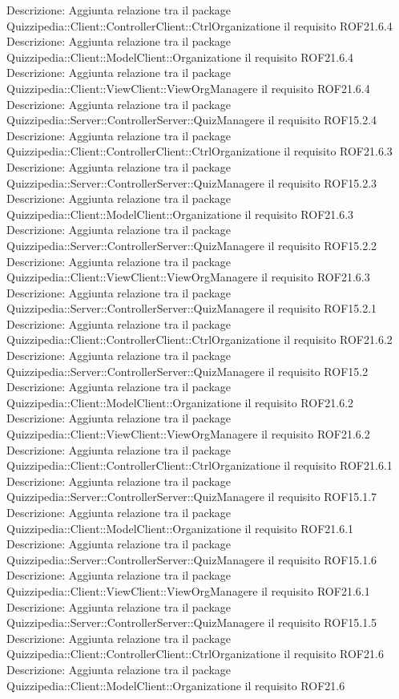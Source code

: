 Descrizione: Aggiunta relazione tra il package Quizzipedia::Client::ControllerClient::CtrlOrganizatione il requisito ROF21.6.4 
Descrizione: Aggiunta relazione tra il package Quizzipedia::Client::ModelClient::Organizatione il requisito ROF21.6.4 
Descrizione: Aggiunta relazione tra il package Quizzipedia::Client::ViewClient::ViewOrgManagere il requisito ROF21.6.4 
Descrizione: Aggiunta relazione tra il package Quizzipedia::Server::ControllerServer::QuizManagere il requisito ROF15.2.4 
Descrizione: Aggiunta relazione tra il package Quizzipedia::Client::ControllerClient::CtrlOrganizatione il requisito ROF21.6.3 
Descrizione: Aggiunta relazione tra il package Quizzipedia::Server::ControllerServer::QuizManagere il requisito ROF15.2.3 
Descrizione: Aggiunta relazione tra il package Quizzipedia::Client::ModelClient::Organizatione il requisito ROF21.6.3 
Descrizione: Aggiunta relazione tra il package Quizzipedia::Server::ControllerServer::QuizManagere il requisito ROF15.2.2 
Descrizione: Aggiunta relazione tra il package Quizzipedia::Client::ViewClient::ViewOrgManagere il requisito ROF21.6.3 
Descrizione: Aggiunta relazione tra il package Quizzipedia::Server::ControllerServer::QuizManagere il requisito ROF15.2.1 
Descrizione: Aggiunta relazione tra il package Quizzipedia::Client::ControllerClient::CtrlOrganizatione il requisito ROF21.6.2 
Descrizione: Aggiunta relazione tra il package Quizzipedia::Server::ControllerServer::QuizManagere il requisito ROF15.2 
Descrizione: Aggiunta relazione tra il package Quizzipedia::Client::ModelClient::Organizatione il requisito ROF21.6.2 
Descrizione: Aggiunta relazione tra il package Quizzipedia::Client::ViewClient::ViewOrgManagere il requisito ROF21.6.2 
Descrizione: Aggiunta relazione tra il package Quizzipedia::Client::ControllerClient::CtrlOrganizatione il requisito ROF21.6.1 
Descrizione: Aggiunta relazione tra il package Quizzipedia::Server::ControllerServer::QuizManagere il requisito ROF15.1.7 
Descrizione: Aggiunta relazione tra il package Quizzipedia::Client::ModelClient::Organizatione il requisito ROF21.6.1 
Descrizione: Aggiunta relazione tra il package Quizzipedia::Server::ControllerServer::QuizManagere il requisito ROF15.1.6 
Descrizione: Aggiunta relazione tra il package Quizzipedia::Client::ViewClient::ViewOrgManagere il requisito ROF21.6.1 
Descrizione: Aggiunta relazione tra il package Quizzipedia::Server::ControllerServer::QuizManagere il requisito ROF15.1.5 
Descrizione: Aggiunta relazione tra il package Quizzipedia::Client::ControllerClient::CtrlOrganizatione il requisito ROF21.6 
Descrizione: Aggiunta relazione tra il package Quizzipedia::Client::ModelClient::Organizatione il requisito ROF21.6 
